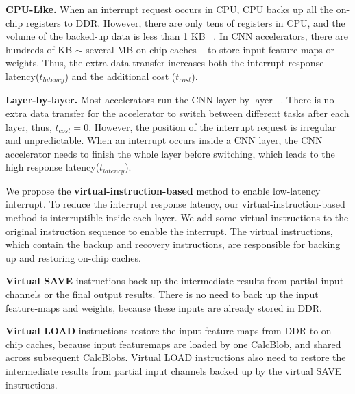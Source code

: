 \textbf{CPU-Like.}
When an interrupt request occurs in CPU, CPU backs up all the on-chip registers to DDR. However, there are only tens of registers in CPU, and the volume of the backed-up data is less than 1 KB  ~\cite{furber2000arm}. In CNN accelerators, there are hundreds of KB $\sim$ several MB on-chip caches  ~\cite{qiu2016going, guo2017angel} to store input feature-maps or weights. 
Thus, the extra data transfer increases both the interrupt response latency($t_{latency}$) and the additional cost ($t_{cost}$).

\textbf{Layer-by-layer.}
Most accelerators run the CNN layer by layer  ~\cite{qiu2016going,guo2017angel}. 
There is no extra data transfer for the accelerator to switch between different tasks after each layer, thus, $t_{cost}=0$. 
However, the position of the interrupt request is irregular and unpredictable. When an interrupt occurs inside a CNN layer, the CNN accelerator needs to finish the whole layer before switching, which leads to the high response latency($t_{latency}$).




We propose the \textbf{virtual-instruction-based} method to enable low-latency interrupt. 
To reduce the interrupt response latency, our virtual-instruction-based method is interruptible inside each layer. We add some virtual instructions to the original instruction sequence to enable the interrupt.
The virtual instructions, which contain the backup and recovery instructions, are responsible for backing up and restoring on-chip caches. 

\textbf{Virtual SAVE} instructions back up the intermediate results from partial input channels or the final output results. There is no need to back up the input feature-maps and weights, because these inputs are already stored in DDR. 

\textbf{Virtual LOAD} instructions restore the input feature-maps from DDR to on-chip caches, because input featuremaps are loaded by one CalcBlob, and shared across subsequent CalcBlobs.
Virtual LOAD instructions also need to restore the intermediate results from partial input channels backed up by the virtual SAVE instructions.

